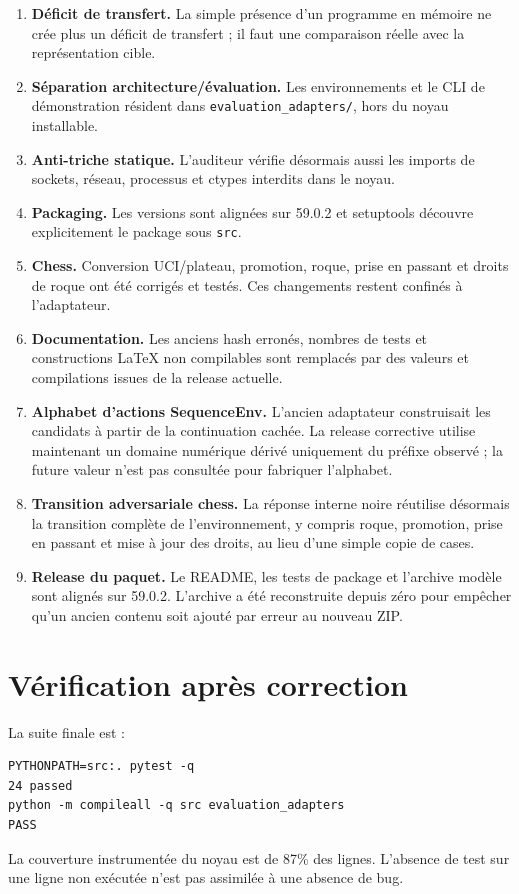 \documentclass[11pt,a4paper]{article}
\begin{document}
\begin{enumerate}
\item \textbf{Déficit de transfert.} La simple présence d'un programme en mémoire ne crée plus un déficit de transfert ; il faut une comparaison réelle avec la représentation cible.
\item \textbf{Séparation architecture/évaluation.} Les environnements et le CLI de démonstration résident dans \texttt{evaluation\_adapters/}, hors du noyau installable.
\item \textbf{Anti-triche statique.} L'auditeur vérifie désormais aussi les imports de sockets, réseau, processus et ctypes interdits dans le noyau.
\item \textbf{Packaging.} Les versions sont alignées sur 59.0.2 et setuptools découvre explicitement le package sous \texttt{src}.
\item \textbf{Chess.} Conversion UCI/plateau, promotion, roque, prise en passant et droits de roque ont été corrigés et testés. Ces changements restent confinés à l'adaptateur.
\item \textbf{Documentation.} Les anciens hash erronés, nombres de tests et constructions LaTeX non compilables sont remplacés par des valeurs et compilations issues de la release actuelle.
\item \textbf{Alphabet d’actions SequenceEnv.} L’ancien adaptateur construisait les candidats à partir de la continuation cachée. La release corrective utilise maintenant un domaine numérique dérivé uniquement du préfixe observé ; la future valeur n’est pas consultée pour fabriquer l’alphabet.
\item \textbf{Transition adversariale chess.} La réponse interne noire réutilise désormais la transition complète de l’environnement, y compris roque, promotion, prise en passant et mise à jour des droits, au lieu d’une simple copie de cases.
\item \textbf{Release du paquet.} Le README, les tests de package et l’archive modèle sont alignés sur 59.0.2. L’archive a été reconstruite depuis zéro pour empêcher qu’un ancien contenu soit ajouté par erreur au nouveau ZIP.
\end{enumerate}

\section{Vérification après correction}
La suite finale est :
\begin{verbatim}
PYTHONPATH=src:. pytest -q
24 passed
python -m compileall -q src evaluation_adapters
PASS
\end{verbatim}
La couverture instrumentée du noyau est de 87\% des lignes. L'absence de test sur une ligne non exécutée n'est pas assimilée à une absence de bug.
\end{document}
